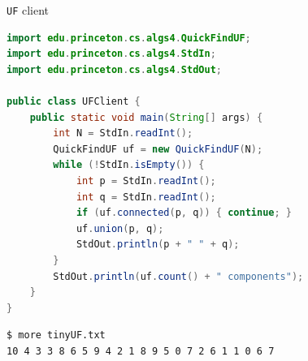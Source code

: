 \documentclass[8pt,a4paper,compress]{beamer}
\begin{document}
\begin{frame}[fragile]
\begin{minipage}{250pt}

\pause\smallskip

\lstinline{UF} client

\smallskip

\begin{lstlisting}[language=Java,style=focusin]
import edu.princeton.cs.algs4.QuickFindUF;
import edu.princeton.cs.algs4.StdIn;
import edu.princeton.cs.algs4.StdOut;

public class UFClient {
    public static void main(String[] args) {
        int N = StdIn.readInt();
        QuickFindUF uf = new QuickFindUF(N);
        while (!StdIn.isEmpty()) {
            int p = StdIn.readInt();
            int q = StdIn.readInt();
            if (uf.connected(p, q)) { continue; }
            uf.union(p, q);
            StdOut.println(p + " " + q);
        }
        StdOut.println(uf.count() + " components");
    }
}
\end{lstlisting}
    
\pause\smallskip

\begin{lstlisting}[language={},style=focusin]
$ more tinyUF.txt
10 4 3 3 8 6 5 9 4 2 1 8 9 5 0 7 2 6 1 1 0 6 7
\end{lstlisting}    

\pause\smallskip


\end{minipage}
\end{frame}
\end{document}
